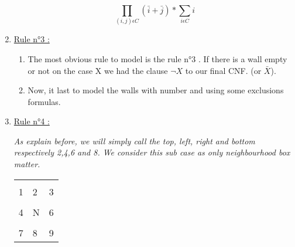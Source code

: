 \documentclass[a4paper]{article}
\begin{document}
\begin{enumerate}
$$ \prod_{ (i,j) \epsilon C} ( \bar{i} + \bar{j} ) * \sum_{i \epsilon C} i$$

	\item \underline{Rule n°3 :}
	\medskip
	\newline

	\begin{enumerate}
	 \item The most obvious rule to model is the rule n°3 . If there is a wall empty or not on the case X we had the clause $\neg X$ to our final CNF. (or $\bar{X}$).
  	 \item Now, it last to model the walls with number and using some exclusions formulas.
	\end{enumerate}

	\item \underline{Rule n°4 :}
	\medskip
	\newline


\textit{As explain before, we will simply call the top, left, right and bottom respectively 2,4,6 and 8. We consider this sub case as only neighbourhood box matter.}

\begin{center}
	\begin{tabular}{|m{}|m{}|m{}|}
        \hline
            &   &      \\[1ex]
          1 & 2 & 3  \\[2ex]
        \hline
            & \cellcolor[gray]{0.5}   &   \\[1ex]
          4 & \cellcolor[gray]{0.5} N & 6 \\[2ex]
        \hline
            &   &   \\[1ex]
          7 & 8 & 9 \\[2ex]
        \hline
      \end{tabular}
\end{center}


\end{enumerate}
\end{document}

